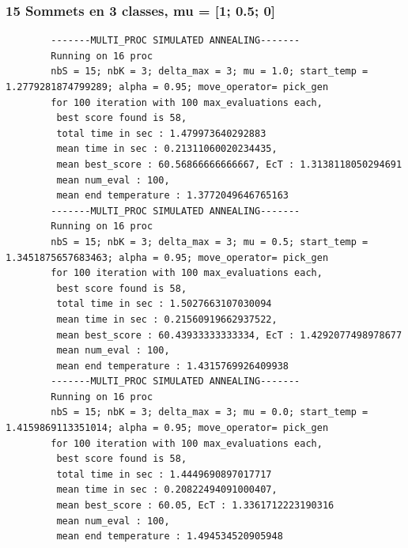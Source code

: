 \documentclass[a4paper]{article}
\begin{document}
		\subsubsection{15 Sommets en 3 classes, mu = [1; 0.5; 0]}
		\begin{verbatim}
		-------MULTI_PROC SIMULATED ANNEALING-------
		Running on 16 proc
		nbS = 15; nbK = 3; delta_max = 3; mu = 1.0; start_temp = 1.2779281874799289; alpha = 0.95; move_operator= pick_gen
		for 100 iteration with 100 max_evaluations each, 
		 best score found is 58,
		 total time in sec : 1.479973640292883
		 mean time in sec : 0.21311060020234435,
		 mean best_score : 60.56866666666667, EcT : 1.3138118050294691
		 mean num_eval : 100,
		 mean end temperature : 1.3772049646765163
		-------MULTI_PROC SIMULATED ANNEALING-------
		Running on 16 proc
		nbS = 15; nbK = 3; delta_max = 3; mu = 0.5; start_temp = 1.3451875657683463; alpha = 0.95; move_operator= pick_gen
		for 100 iteration with 100 max_evaluations each, 
		 best score found is 58,
		 total time in sec : 1.5027663107030094
		 mean time in sec : 0.21560919662937522,
		 mean best_score : 60.43933333333334, EcT : 1.4292077498978677
		 mean num_eval : 100,
		 mean end temperature : 1.4315769926409938
		-------MULTI_PROC SIMULATED ANNEALING-------
		Running on 16 proc
		nbS = 15; nbK = 3; delta_max = 3; mu = 0.0; start_temp = 1.4159869113351014; alpha = 0.95; move_operator= pick_gen
		for 100 iteration with 100 max_evaluations each, 
		 best score found is 58,
		 total time in sec : 1.4449690897017717
		 mean time in sec : 0.20822494091000407,
		 mean best_score : 60.05, EcT : 1.3361712223190316
		 mean num_eval : 100,
		 mean end temperature : 1.494534520905948
		\end{verbatim}
\end{document}
